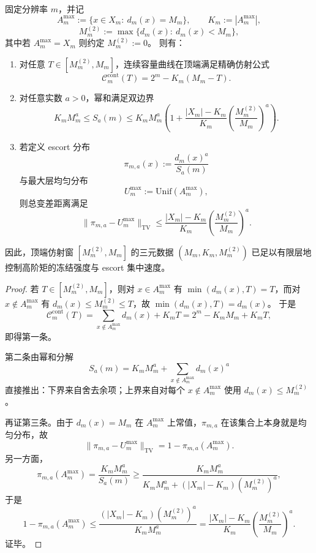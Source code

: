 \begin{theorem}[顶端仿射窗控制的有限层冻结估计]\label{thm:fold-top-affine-window-controls-finite-freezing}
固定分辨率 \(m\)，并记
\[
A_m^{\max}:=\{x\in X_m:\ d_m(x)=M_m\},
\qquad
K_m:=|A_m^{\max}|,
\]
\[
M_m^{(2)}:=\max\{d_m(x):\ d_m(x)<M_m\},
\]
其中若 \(A_m^{\max}=X_m\) 则约定 \(M_m^{(2)}:=0\)。
则有：
\begin{enumerate}
  \item 对任意 \(T\in[M_m^{(2)},M_m]\)，连续容量曲线在顶端满足精确仿射公式
  \[
  \boxed{\;
  \mathcal C_m^{\mathrm{cont}}(T)=2^m-K_m(M_m-T).\;}
  \]
  \item 对任意实数 \(a>0\)，幂和满足双边界
  \[
  \boxed{\;
  K_mM_m^a
  \le
  S_a(m)
  \le
  K_mM_m^a\left(1+\frac{|X_m|-K_m}{K_m}
  \left(\frac{M_m^{(2)}}{M_m}\right)^a\right).\;}
  \]
  \item 若定义 escort 分布
  \[
  \pi_{m,a}(x):=\frac{d_m(x)^a}{S_a(m)}
  \]
  与最大层均匀分布
  \[
  U_m^{\max}:=\mathrm{Unif}(A_m^{\max}),
  \]
  则总变差距离满足
  \[
  \boxed{\;
  \|\pi_{m,a}-U_m^{\max}\|_{\mathrm{TV}}
  \le
  \frac{|X_m|-K_m}{K_m}
  \left(\frac{M_m^{(2)}}{M_m}\right)^a.\;}
  \]
\end{enumerate}
因此，顶端仿射窗 \([M_m^{(2)},M_m]\) 的三元数据 \((M_m,K_m,M_m^{(2)})\) 已足以有限层地控制高阶矩的冻结强度与 escort 集中速度。
\end{theorem}
\begin{proof}
若 \(T\in[M_m^{(2)},M_m]\)，则对 \(x\in A_m^{\max}\) 有 \(\min(d_m(x),T)=T\)，而对 \(x\notin A_m^{\max}\) 有 \(d_m(x)\le M_m^{(2)}\le T\)，故 \(\min(d_m(x),T)=d_m(x)\)。
于是
\[
\mathcal C_m^{\mathrm{cont}}(T)
=\sum_{x\notin A_m^{\max}}d_m(x)+K_mT
=2^m-K_mM_m+K_mT,
\]
即得第一条。

第二条由幂和分解
\[
S_a(m)=K_mM_m^a+\sum_{x\notin A_m^{\max}}d_m(x)^a
\]
直接推出：下界来自舍去余项；上界来自对每个 \(x\notin A_m^{\max}\) 使用 \(d_m(x)\le M_m^{(2)}\)。

再证第三条。由于 \(d_m(x)=M_m\) 在 \(A_m^{\max}\) 上常值，\(\pi_{m,a}\) 在该集合上本身就是均匀分布，故
\[
\|\pi_{m,a}-U_m^{\max}\|_{\mathrm{TV}}
=1-\pi_{m,a}(A_m^{\max}).
\]
另一方面，
\[
\pi_{m,a}(A_m^{\max})
=\frac{K_mM_m^a}{S_a(m)}
\ge
\frac{K_mM_m^a}{K_mM_m^a+(|X_m|-K_m)(M_m^{(2)})^a},
\]
于是
\[
1-\pi_{m,a}(A_m^{\max})
\le
\frac{(|X_m|-K_m)(M_m^{(2)})^a}{K_mM_m^a}
=
\frac{|X_m|-K_m}{K_m}\left(\frac{M_m^{(2)}}{M_m}\right)^a.
\]
证毕。
\end{proof}
